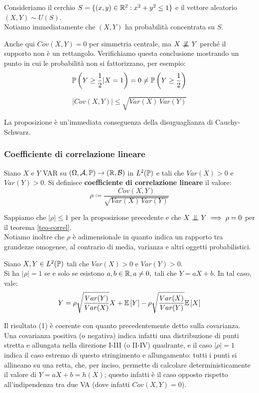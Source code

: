 \medskip
\begin{ese}
  Consideriamo il cerchio $S = \{ (x,y) \in \mathbb R^2 : x^2 + y^2 \leq 1 \}$ e il vettore aleatorio $(X,Y) \sim U(S)$. \\
  Notiamo immediatamente che $(X, Y)$ ha probabilità concentrata su $S$.

  Anche qui $Cov(X,Y) = 0$ per simmetria centrale, ma $X \centernot\indep Y$ perché il supporto non è un rettangolo. Verifichiamo questa conclusione mostrando un punto in cui le probabilità non si fattorizzano, per esempio:
  $$\mathbb P \left(Y \geq \frac{1}{2} | X = 1 \right) = 0 \neq \mathbb P \left(Y \geq \frac{1}{2} \right)$$
\end{ese}

\medskip
\begin{prop}
  $$|Cov(X,Y)| \leq \sqrt{Var(X) \, Var(Y)}$$
\end{prop}
La proposizione è un'immediata conseguenza della disuguaglianza di Cauchy-Schwarz.

\subsubsection{Coefficiente di correlazione lineare}

\begin{defn}
  Siano $X$ e $Y$ VAR su $\DoCo[1]$ in $L^2(\mathbb P)$ e tali che $Var(X)>0$ e $Var(Y)>0$.
  Si definisce \textbf{coefficiente di correlazione lineare} il valore:
  $$\rho \coloneqq \frac{Cov(X,Y)}{\sqrt{Var(X) \, Var(Y)}}$$
\end{defn}
Sappiamo che $|\rho| \leq 1$ per la proposizione precedente e che $X \indep Y \implies \rho = 0$ per il teorema \ref{teo-correl}. \\
Notiamo inoltre che $\rho$ è adimensionale in quanto indica un rapporto tra grandezze omogenee, al contrario di media, varianza e altri oggetti probabilistici.

\medskip
\begin{prop}
  Siano $X,Y \in L^2(\mathbb P)$ tali che $Var(X)>0$ e $Var(Y)>0$. \\
  Si ha $|\rho| = 1$ se e solo se esistono $a, b \in \mathbb R, a \neq 0,$ tali che $Y = aX + b$. In tal caso, vale:
    $$Y =
    \rho \sqrt{\dfrac{Var(Y)}{Var(X)}}X + \mathbb E \left[ Y \right] -
    \rho \sqrt{\dfrac{Var(X)}{Var(Y)}} \mathbb E \left[ X \right]$$
\end{prop}

Il risultato (1) è coerente con quanto precedentemente detto sulla covarianza. Una covarianza positiva (o negativa) indica infatti una distribuzione di punti stretta e allungata nella direzione I-III (o II-IV) quadrante, e il caso $|\rho| = 1$ indica il caso estremo di questo stringimento e allungamento: tutti i punti si allineano su una retta, che, per inciso, permette di calcolare deterministicamente il valore di $Y = aX + b = h(X)$; questo infatti è il caso opposto rispetto all'indipendenza tra due VA (dove infatti $Cov(X,Y) = 0$).

